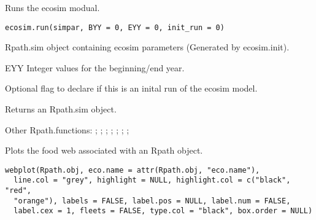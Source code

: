 \documentclass[a4paper]{book}
\begin{document}
%
\begin{Description}\relax
Runs the ecosim modual.
\end{Description}
%
\begin{Usage}
\begin{verbatim}
ecosim.run(simpar, BYY = 0, EYY = 0, init_run = 0)
\end{verbatim}
\end{Usage}
%
\begin{Arguments}
\begin{ldescription}
\item[\code{simpar}] Rpath.sim object containing ecosim parameters (Generated by ecosim.init).

\item[\code{BYY,}] EYY Integer values for the beginning/end year.

\item[\code{init\_run}] Optional flag to declare if this is an inital run of the ecosim model.
\end{ldescription}
\end{Arguments}
%
\begin{Value}
Returns an Rpath.sim object.
\end{Value}
%
\begin{SeeAlso}\relax
Other Rpath.functions: ;
; ;
; ;
; ;
\end{SeeAlso}
%
\begin{Description}\relax
Plots the food web associated with an Rpath object.
\end{Description}
%
\begin{Usage}
\begin{verbatim}
webplot(Rpath.obj, eco.name = attr(Rpath.obj, "eco.name"),
  line.col = "grey", highlight = NULL, highlight.col = c("black", "red",
  "orange"), labels = FALSE, label.pos = NULL, label.num = FALSE,
  label.cex = 1, fleets = FALSE, type.col = "black", box.order = NULL)
\end{verbatim}
\end{Usage}
%
\end{document}
